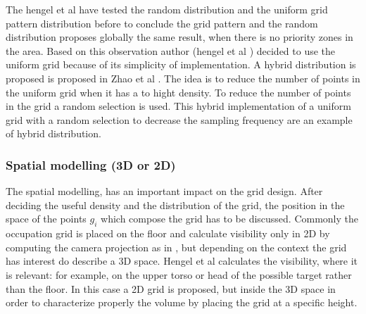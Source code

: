 The hengel et al \cite{83*van2009} have tested the random distribution and the uniform grid pattern distribution before to conclude the grid pattern and the random distribution proposes globally the same result, when there is no priority zones in the area. Based on this observation author (hengel et al \cite{83*van2009}) decided to use the uniform grid because of its simplicity of implementation.
A  hybrid distribution is proposed is proposed in  Zhao et al \cite{22*zhao2008}.
The idea is to reduce the number of points in the uniform grid when it has a to hight density. To reduce the number of points in the grid a random selection is used. This hybrid implementation of a uniform grid with a random selection to decrease the sampling frequency are an example of hybrid distribution.


\subsubsection{Spatial modelling (3D or 2D)}
 The spatial modelling,  has an important impact on the grid design. After deciding the useful density and the distribution of the grid, the position in the space of the points $g_i$ which compose the grid  has to be discussed.  
 Commonly the occupation grid is placed on the floor and calculate visibility only in 2D  by computing the  camera projection as in  \citep{164*valente2013,150*chakrabarty2002,8*zhou2011,170*yabuta2008,171*horster2006,22*zhao2008}, but depending on the context the grid has interest do describe a 3D space.  
Hengel et al \cite{83*van2009} calculates the visibility, where it is relevant: for example, on the upper torso or head of the possible target rather than the floor. In this case a 2D grid is proposed, but inside the 3D space in order to  characterize properly the volume by placing the grid at a specific height.  

